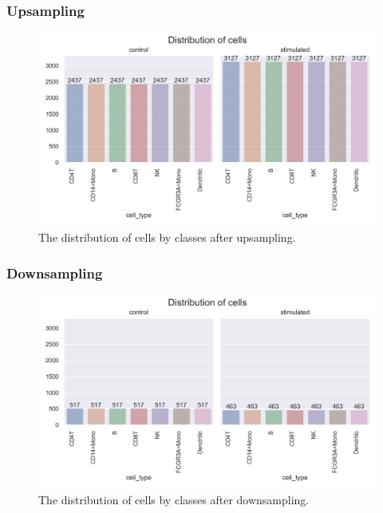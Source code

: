 {\subsubsection{Upsampling}

\begin{figure}[htbp]
    \centerline{\includegraphics[width=0.6\columnwidth]{pictures/upsampled-dataset.png}}
    \caption{The distribution of cells by classes after upsampling.}
    \label{dataset-cell-types}
\end{figure}

\subsubsection{Downsampling}

\begin{figure}[htbp]
    \centerline{\includegraphics[width=0.6\columnwidth]{pictures/downsampled-dataset.png}}
    \caption{The distribution of cells by classes after downsampling.}
    \label{dataset-cell-types}
\end{figure}
}